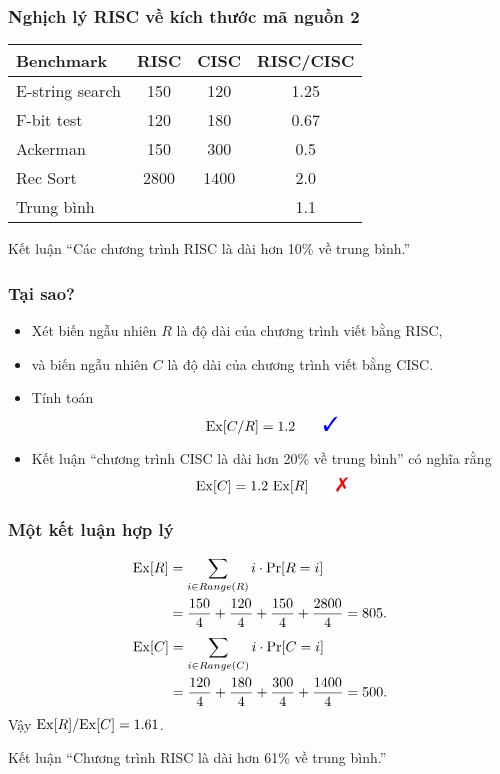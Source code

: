 \begin{frame}
  \frametitle{Nghịch lý RISC về   kích thước mã nguồn 2}
  \begin{center}
    \begin{tabular}{lccc}
      Benchmark & RISC &CISC &RISC/CISC \\
      \hline 
      E-string search  &150 &120 &1.25 \\
      F-bit test       &120 &180 &0.67\\
      Ackerman         &150 &300 &0.5\\
      Rec Sort         &2800 &1400 &2.0 \\
\hline
      Trung bình                  & & &1.1
 
    \end{tabular}
  \end{center}

  \begin{block}{Kết luận}
    ``Các chương trình RISC là dài hơn 10\% về trung bình.'' 
  \end{block}
\end{frame}

\begin{frame}
  \frametitle{Tại sao?}
  \begin{itemize}
  \item Xét biến ngẫu nhiên $R$ là độ dài của chương trình viết bằng  RISC, 
  \item và biến ngẫu nhiên  $C$ là độ dài của chương trình viết bằng
    CISC.
  \item  Tính toán  
    $$
    \ex[C/R] = 1.2 \qquad \text{\cmark}
    $$
  \item Kết luận  ``chương trình CISC là dài hơn 20\% về trung bình''
    có nghĩa rằng 
    $$
    \ex[C] = 1.2\  \ex[R]\qquad  \text{\xmark}
    $$

  \end{itemize}
\end{frame}

\begin{frame}
  \frametitle{Một kết luận hợp lý }
  \begin{align*}
    \mathrm{Ex}[R] &= \sum_{i \in Range(R)} i\cdot \mathrm{Pr}[R = i]\\
           &= \frac{150}{4} + \frac{120}{4}
             +\frac{150}{4} + \frac{2800}{4}= 805.
  \end{align*}
  \begin{align*}
    \mathrm{Ex}[C] &= \sum_{i \in Range(C)} i\cdot \mathrm{Pr}[C = i]\\
           &= \frac{120}{4} + \frac{180}{4} +\frac{300}{4}
             +\frac{1400}{4} = 500.
  \end{align*}
Vậy $\mathrm{Ex}[R]/\mathrm{Ex}[C] = 1.61$. 
\begin{block}{Kết luận}
    ``Chương trình RISC là dài hơn 61\% về trung bình.''   
\end{block}
\end{frame}




